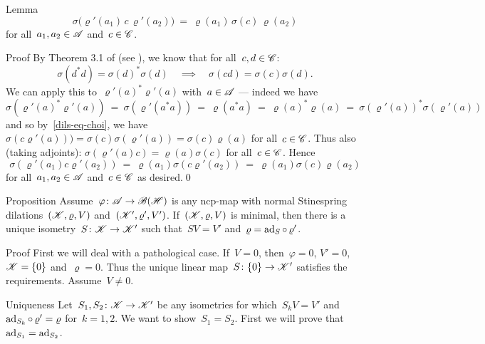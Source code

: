 \documentclass[b]{subfiles}
\begin{document}
\begin{parsec}
\begin{point}{Lemma}
\begin{equation*}
\sigma\bigl(\varrho'(a_1)\,c\, \varrho'(a_2)\bigr) \ =\   \varrho(a_1) \,\sigma(c) \,\varrho(a_2)
\end{equation*}
    for all~$a_1,a_2 \in \mathscr{A}$ and~$c \in \mathscr{C}$.
\begin{point}{Proof}%
By Theorem 3.1 of \cite{choi} (see ),
we know that for all~$c,d\in\mathscr{C}$:
\begin{equation}
    \sigma(d^*d) = \sigma(d)^*\sigma(d) \quad \implies \quad
    \sigma(cd) = \sigma(c)\sigma(d).\label{dils-eq-choi}
\end{equation}
We can apply this to~$\varrho'(a)^*\varrho'(a)$
with~$a \in \mathscr{A}$ --- indeed we have
\begin{equation*}
\sigma(\varrho'(a)^* \varrho'(a))
  \   =\ \sigma(\varrho'(a^*a))
  \  =\ \varrho(a^*a)
  \  =\ \varrho(a)^*\varrho(a)
  \  =\ \sigma(\varrho'(a))^*\sigma(\varrho'(a))
\end{equation*}
and so by~\eqref{dils-eq-choi},
    we have~$\sigma(c\varrho'(a)))
        = \sigma(c)\sigma(\varrho'(a)) = \sigma(c)\varrho(a)$
        for all~$c \in \mathscr{C}$.
Thus also (taking adjoints):
$\sigma(\varrho'(a)c) = \varrho(a)\sigma(c)$ for all~$c \in \mathscr{C}$.
Hence
\begin{equation*}
\sigma(\varrho'(a_1)c\varrho'(a_2))
            \ =\  \varrho(a_1)\sigma(c \varrho'(a_2))
            \ =\  \varrho(a_1) \sigma(c) \varrho(a_2)
\end{equation*}
    for all~$a_1,a_2 \in \mathscr{A}$ and~$c\in \mathscr{C}$ as desired.\qed
\end{point}
\end{point}
\begin{point}{Proposition}%
    Assume~$\varphi\colon \mathscr{A} \to \mathscr{B}(\mathscr{H})$
        is any ncp-map with normal
        Stinespring dilations~$(\mathscr{K}, \varrho, V)$
    and~$(\mathscr{K}', \varrho', V')$.
        If~$(\mathscr{K},\varrho,V)$ is minimal,
        then there is a unique isometry~$S\colon \mathscr{K} \to \mathscr{K}'$
        such that~$SV=V'$ and~$\varrho = \mathrm{ad}_S\mathop{\circ} \varrho'$.
\begin{point}{Proof}
First we will deal with a pathological case.
If~$V = 0$, then~$\varphi = 0$, $V' = 0$, $\mathscr{K} = \{0\}$
and~$\varrho = 0$.  Thus the unique linear map~$S\colon \{0\} \to \mathscr{K}'$
satisfies the requirements.  Assume~$V \neq 0$.
\begin{point}{Uniqueness}%
Let~$S_1,S_2\colon \mathscr{K} \to \mathscr{K}'$
be any isometries for which~$S_k V = V'$ and~$\mathrm{ad}_{S_k} \mathop{\circ} \varrho' = \varrho$
for~$k =1,2$.
We want to show~$S_1=S_2$.
First we will prove that~$\mathrm{ad}_{S_1} = \mathrm{ad}_{S_2}$.

\end{point}
\end{point}
\end{point}
\end{parsec}
\end{document}
